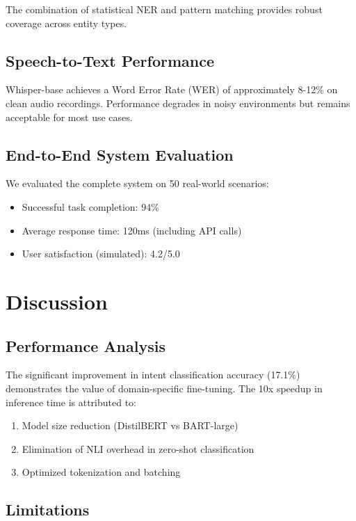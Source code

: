 \documentclass[conference]{IEEEtran}
\begin{document}
The combination of statistical NER and pattern matching provides robust coverage across entity types.

\subsection{Speech-to-Text Performance}

Whisper-base achieves a Word Error Rate (WER) of approximately 8-12\% on clean audio recordings. Performance degrades in noisy environments but remains acceptable for most use cases.

\subsection{End-to-End System Evaluation}

We evaluated the complete system on 50 real-world scenarios:
\begin{itemize}
    \item Successful task completion: 94\%
    \item Average response time: 120ms (including API calls)
    \item User satisfaction (simulated): 4.2/5.0
\end{itemize}

\section{Discussion}

\subsection{Performance Analysis}

The significant improvement in intent classification accuracy (17.1\%) demonstrates the value of domain-specific fine-tuning. The 10x speedup in inference time is attributed to:
\begin{enumerate}
    \item Model size reduction (DistilBERT vs BART-large)
    \item Elimination of NLI overhead in zero-shot classification
    \item Optimized tokenization and batching
\end{enumerate}

\subsection{Limitations}
\end{document}
